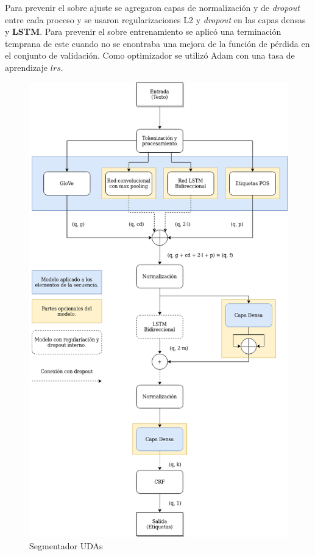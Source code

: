 Para prevenir el sobre ajuste se agregaron capas de normalización y de \emph{dropout} entre cada proceso y se usaron regularizaciones
L2 y \emph{dropout} en las capas densas y \textbf{LSTM}. Para prevenir el sobre entrenamiento se aplicó una 
terminación temprana de este cuando no se enontraba una mejora de la función de pérdida en el conjunto de validación.
Como optimizador se utilizó Adam con una tasa de aprendizaje $lrs$.

\begin{figure}[h!]
	\begin{center}
		\begin{center}
			\includegraphics[scale=.3]{Graphics/Modelo_Segmenter_UDA.png}
        \end{center}
	    \caption{Segmentador UDAs}\label{fig:seg_uda}
	\end{center}
\end{figure}

